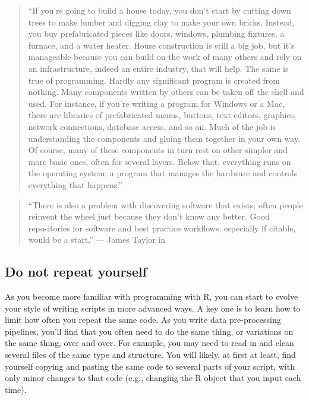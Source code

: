 \documentclass[]{tufte-book}
\begin{document}
\begin{quote}
``If you're going to build a house today, you don't start by cutting down trees to make
lumber and digging clay to make your own bricks. Instead, you buy prefabricated pieces like
doors, windows, plumbing fixtures, a furnace, and a water heater. House construction is still
a big job, but it's manageable because you can build on the work of many others and rely
on an infrastructure, indeed an entire industry, that will help. The same is true of
programming. Hardly any significant program is created from nothing. Many components written
by others can be taken off the shelf and used. For instance, if you're writing a program for
Windows or a Mac, there are libraries of prefabricated menus, buttons, text editors, graphics,
network connections, database access, and so on. Much of the job is understanding the components
and gluing them together in your own way. Of course, many of these components in turn rest on
other simpler and more basic ones, often for several layers. Below that, everything runs on
the operating system, a program that manages the hardware and controls everything that happens.''
\citep{kernighan2011d}
\end{quote}

\begin{quote}
``There is also a problem with discovering software that exists; often people
reinvent the wheel just because they don't know any better. Good repositories
for software and best practice workflows, especially if citable, would be a
start.'' --- James Taylor in \citep{altschul2013anatomy}
\end{quote}

\subsection{Do not repeat yourself}\label{do-not-repeat-yourself}

As you become more familiar with programming with R, you can start to evolve your
style of writing scripts in more advanced ways. A key one is to learn how to limit
how often you repeat the same code. As you write data pre-processing pipelines, you'll
find that you often need to do the same thing, or variations on the same thing, over
and over. For example, you may need to read in and clean several files of the same
type and structure. You will likely, at first at least, find yourself copying and
pasting the same code to several parts of your script, with only minor changes to
that code (e.g., changing the R object that you input each time).
\end{document}
